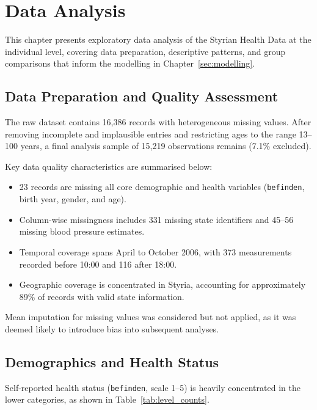 \chapter{Data Analysis}
\label{sec:data_analysis}
\label{sec:eda}

This chapter presents exploratory data analysis of the Styrian Health Data at the individual level, covering data preparation, descriptive patterns, and group comparisons that inform the modelling in Chapter~\ref{sec:modelling}.

\section{Data Preparation and Quality Assessment}
\label{sec:eda_prep}

The raw dataset contains 16,386 records with heterogeneous missing values. After removing incomplete and implausible entries and restricting ages to the range 13--100 years, a final analysis sample of 15,219 observations remains (7.1\% excluded).

Key data quality characteristics are summarised below:
\begin{itemize}
    \item 23 records are missing all core demographic and health variables (\texttt{befinden}, birth year, gender, and age).
    \item Column-wise missingness includes 331 missing state identifiers and 45--56 missing blood pressure estimates.
    \item Temporal coverage spans April to October 2006, with 373 measurements recorded before 10:00 and 116 after 18:00.
    \item Geographic coverage is concentrated in Styria, accounting for approximately 89\% of records with valid state information.
\end{itemize}

Mean imputation for missing values was considered but not applied, as it was deemed likely to introduce bias into subsequent analyses.

\section{Demographics and Health Status}
\label{sec:eda_demographics}

Self-reported health status (\texttt{befinden}, scale 1--5) is heavily concentrated in the lower categories, as shown in Table~\ref{tab:level_counts}.

